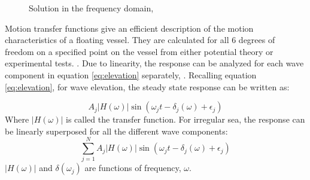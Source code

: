 \begin{figure}[H]
\hfill
{}\hfill
  \hfill
\caption[$\; \:$Solution in the frequency domain]{Solution in the frequency domain, \cite{Langen1999}}
\label{fig:transex}
\end{figure}

\noindent Motion transfer functions give an efficient description of the motion characteristics of a floating vessel. They are calculated for all 6 degrees of freedom on a specified point on the vessel from either potential theory or experimental tests. \cite{sintef2017}. Due to linearity, the response can be analyzed for each wave component in equation \ref{eq:elevation} separately, \cite{Faltinsen1990}. Recalling equation \ref{eq:elevation}, for wave elevation, the steady state response can be written as:

\begin{equation}
    A_j |H(\omega)|\sin(\omega_jt-\delta_j(\omega)+\epsilon_j)
\end{equation}
Where $|H(\omega)|$ is called the transfer function. For irregular sea, the response can be linearly superposed for all the different wave components:
\begin{equation}
    \sum_{j=1}^N  A_j |H(\omega)|\sin(\omega_jt-\delta_j(\omega)+\epsilon_j)
\end{equation}
 $|H(\omega)|$ and $\delta(\omega_j)$ are functions of frequency, $\omega$.\newline 
 \newline


